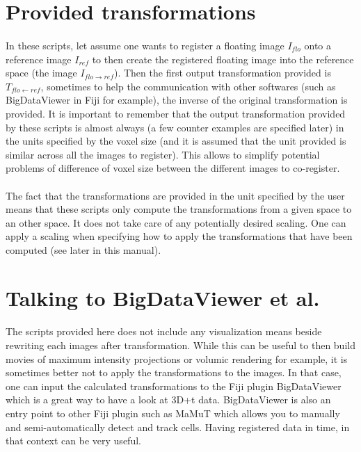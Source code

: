 \documentclass[10pt,a4paper]{book}
\newcommand{\T}[2]{T_{{#1}\leftarrow{#2}}}
\begin{document}
\section{Provided transformations}
\paragraph{}In these scripts, let assume one wants to register a floating image $I_{flo}$ onto a reference image $I_{ref}$ to then create the registered floating image into the reference space (the image $I_{flo\rightarrow ref}$). Then the first output transformation provided is $\T{flo}{ref}$, sometimes to help the communication with other softwares (such as BigDataViewer in Fiji for example), the inverse of the original transformation is provided. It is important to remember that the output transformation provided by these scripts is almost always (a few counter examples are specified later) in the units specified by the voxel size (and it is assumed that the unit provided is similar across all the images to register). This allows to simplify potential problems of difference of voxel size between the different images to co-register.
\paragraph{}The fact that the transformations are provided in the unit specified by the user means that these scripts only compute the transformations from a given space to an other space. It does not take care of any potentially desired scaling. One can apply a scaling when specifying how to apply the transformations that have been computed (see later in this manual).
\section{Talking to BigDataViewer et al.}
\paragraph{}The scripts provided here does not include any visualization means beside rewriting each images after transformation. While this can be useful to then build movies of maximum intensity projections or volumic rendering for example, it is sometimes better not to apply the transformations to the images. In that case, one can input the calculated transformations to the Fiji plugin BigDataViewer which is a great way to have a look at 3D+t data. BigDataViewer is also an entry point to other Fiji plugin such as MaMuT which allows you to manually and semi-automatically detect and track cells. Having registered data in time, in that context can be very useful.
\end{document}
